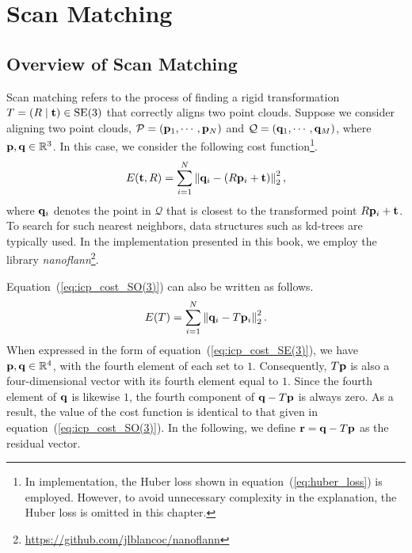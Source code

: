 \chapter{Scan Matching}
\label{sec:scan_matching}

\section{Overview of Scan Matching}

Scan matching refers to the process of finding a rigid transformation $T = \left( R \mid {\bf t} \right) \in {\rm SE}(3)$ that correctly aligns two point clouds.
Suppose we consider aligning two point clouds, $\mathcal{P} = ({\bf p}_{1}, \cdots, {\bf p}_{N})$ and $\mathcal{Q} = ({\bf q}_{1}, \cdots, {\bf q}_{M})$, where ${\bf p}, {\bf q} \in \mathbb{R}^{3}$.
In this case, we consider the following cost function\footnote{In implementation, the Huber loss shown in equation~(\ref{eq:huber_loss}) is employed. However, to avoid unnecessary complexity in the explanation, the Huber loss is omitted in this chapter.}.
%
\begin{align}
  E({\bf t}, R) = \sum_{i=1}^{N} \left\| {\bf q}_{i} - \left( R {\bf p}_{i} + {\bf t} \right) \right\|_{2}^{2},
  \label{eq:icp_cost_SO(3)}
\end{align}
%
where ${\bf q}_{i}$ denotes the point in $\mathcal{Q}$ that is closest to the transformed point $R {\bf p}_{i} + {\bf t}$.
To search for such nearest neighbors, data structures such as kd-trees are typically used.
In the implementation presented in this book, we employ the library {\it nanoflann}\footnote{\url{https://github.com/jlblancoc/nanoflann}}.

Equation~(\ref{eq:icp_cost_SO(3)}) can also be written as follows.
%
\begin{align}
  E(T) = \sum_{i=1}^{N} \left\| {\bf q}_{i} - T {\bf p}_{i} \right\|_{2}^{2}.
  \label{eq:icp_cost_SE(3)}
\end{align}
%
When expressed in the form of equation~(\ref{eq:icp_cost_SE(3)}), we have ${\bf p}, {\bf q} \in \mathbb{R}^{4}$, with the fourth element of each set to $1$.
Consequently, $T{\bf p}$ is also a four-dimensional vector with its fourth element equal to $1$.
Since the fourth element of ${\bf q}$ is likewise $1$, the fourth component of ${\bf q} - T{\bf p}$ is always zero.
As a result, the value of the cost function is identical to that given in equation~(\ref{eq:icp_cost_SO(3)}).
In the following, we define ${\bf r} = {\bf q} - T{\bf p}$ as the residual vector.

